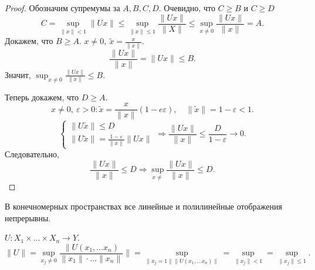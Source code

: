 \begin{proof}
     Обозначим супремумы за $ A, B, C, D$.
     Очевидно, что $ C \ge B$ и $  C \ge D$
     $$ C = \sup_{\|  x  \| < 1} \| Ux \| \le \sup_{\| x \| \le 1} \frac{\| Ux \| }{\| X \| } \le \sup _{x  \ne 0} \frac{\| Ux \| }{\| x \|  } = A.$$
     Докажем, что $ B \ge A$. $ x \ne 0, ~ \tilde x = \frac{x}{\| x \| }$. 
     \[
	 \frac{\| Ux \| }{\| x \| } = \| Ux \|  \le  B
     .\] 
     Значит, $ \sup_{x\ne 0} \frac{\| Ux \| }{\| x \| } \le B$.

     Теперь докажем, что  $ D \ge  A$.
     \[
	 x \ne 0, ~ \varepsilon >0\colon \tilde x = \frac{x}{\|  x \| }(1 -e \varepsilon ), \quad \|\tilde x \|  = 1 - \varepsilon  < 1
     .\] 
     \[
    \begin{cases}
        \| U\tilde x \| \le  D\\
	\| U\tilde x \|  = \frac{1- \varepsilon }{\|  x \| } \| Ux \| 
    \end{cases} 
\Longrightarrow \frac{\| Ux \| }{\| x \|}  \le \frac{D}{1 - \varepsilon } \to  0
     .\] 
     Следовательно, 
     \[
	 \frac{\|  Ux \| }{\| x \| } \le D \Longrightarrow \sup_{x \ne } \frac{\| Ux \| }{\| x \| } \le D
     .\] 
\end{proof}
\begin{rem}
    В конечномерных пространствах все линейные и полилинейные отображения непрерывны. 
\end{rem}
\begin{thm}
    $ U: X_1 \times \ldots \times X_n \to  Y $. \[
	\| U \|  = \sup_{x_j \ne 0} \frac{\| U(x_1, \ldots x_n)}{\| x_1 \| \cdot  \ldots \| x_n \| } \|  = \sup _{ \| x_j=1 \| \| U(x_1, \ldots x_n) \|  }  = \sup_{\|  x_j  \|  < 1} = \sup_{\| x_j \|  \le 1}
    .\]  
\end{thm}

